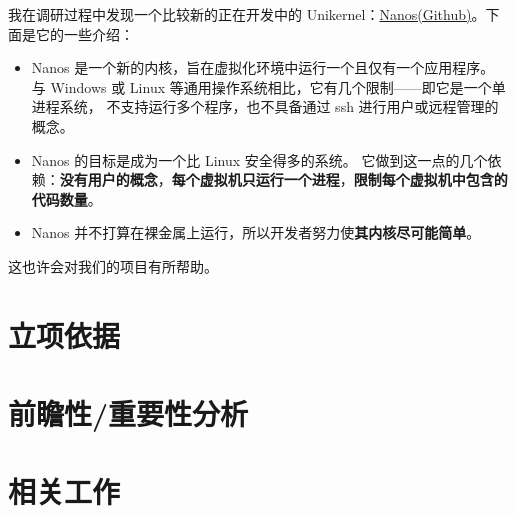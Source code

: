 \documentclass[UTF8,fontset=none,linespread=1.15]{ctexart}
\begin{document}
我在调研过程中发现一个比较新的正在开发中的 Unikernel：\hyperlink{https://github.com/nanovms/nanos}{Nanos(Github)}。下面是它的一些介绍：

\begin{itemize}
\item Nanos 是一个新的内核，旨在虚拟化环境中运行一个且仅有一个应用程序。
与 Windows 或 Linux 等通用操作系统相比，它有几个限制——即它是一个单进程系统，
不支持运行多个程序，也不具备通过 ssh 进行用户或远程管理的概念。
\item Nanos 的目标是成为一个比 Linux 安全得多的系统。
它做到这一点的几个依赖：\textbf{没有用户的概念}，\textbf{每个虚拟机只运行一个进程}，\textbf{限制每个虚拟机中包含的代码数量}。
\item Nanos 并不打算在裸金属上运行，所以开发者努力使\textbf{其内核尽可能简单}。
\end{itemize}

这也许会对我们的项目有所帮助。
\section{立项依据}

\section{前瞻性/重要性分析}

\section{相关工作}
\end{document}
